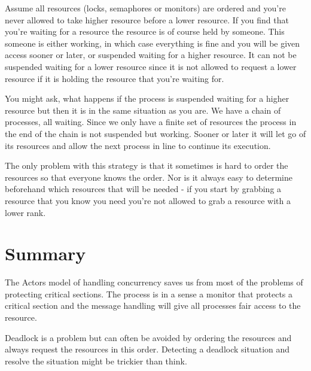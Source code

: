 \documentclass[a4paper,11pt]{article}
\begin{document}
Assume all resources (locks, semaphores or monitors) are ordered and
you're never allowed to take higher resource before a lower
resource. If you find that you're waiting for a resource the resource
is of course held by someone. This someone is either working, in which
case everything is fine and you will be given access sooner or later,
or suspended waiting for a higher resource. It can not be suspended
waiting for a lower resource since it is not allowed to request a
lower resource if it is holding the resource that you're waiting for.

You might ask, what happens if the process is suspended waiting for a
higher resource but then it is in the same situation as you are. We
have a chain of processes, all waiting. Since we only have a finite
set of resources the process in the end of the chain is not suspended
but working. Sooner or later it will let go of its resources and allow
the next process in line to continue its execution.

The only problem with this strategy is that it sometimes is hard to
order the resources so that everyone knows the order. Nor is it always
easy to determine beforehand which resources that will be needed - if
you start by grabbing a resource that you know you need you're not
allowed to grab a resource with a lower rank.


\section{Summary}

The Actors model of handling concurrency saves us from most of the
problems of protecting critical sections. The process is in a sense a
monitor that protects a critical section and the message handling will
give all processes fair access to the resource.

Deadlock is a problem but can often be avoided by ordering the
resources and always request the resources in this order. Detecting a
deadlock situation and resolve the situation might be trickier than
think. 
\end{document}
